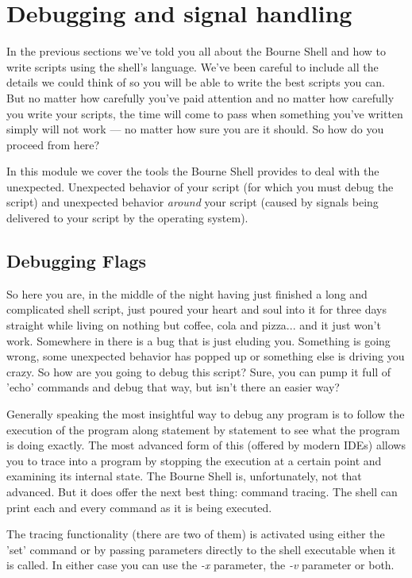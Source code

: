 \section{Debugging and signal handling}
In the previous sections we've told you all about the Bourne Shell and how to
write scripts using the shell's language. We've been careful to include all the
details we could think of so you will be able to write the best scripts you
can. But no matter how carefully you've paid attention and no matter how
carefully you write your scripts, the time will come to pass when something
you've written simply will not work --- no matter how sure you are it should.
So how do you proceed from here?

In this module we cover the tools the Bourne Shell provides to deal with the
unexpected. Unexpected behavior of your script (for which you must debug the
script) and unexpected behavior \emph{around} your script (caused by signals
being delivered to your script by the operating system).

\subsection{Debugging Flags}
So here you are, in the middle of the night having just finished a long and
complicated shell script, just poured your heart and soul into it for three
days straight while living on nothing but coffee, cola and pizza... and it just
won't work. Somewhere in there is a bug that is just eluding you. Something is
going wrong, some unexpected behavior has popped up or something else is
driving you crazy. So how are you going to debug this script? Sure, you can
pump it full of 'echo' commands and debug that way, but isn't there an easier
way?

Generally speaking the most insightful way to debug any program is to follow
the execution of the program along statement by statement to see what the
program is doing exactly. The most advanced form of this (offered by modern
IDEs) allows you to trace into a program by stopping the execution at a certain
point and examining its internal state. The Bourne Shell is, unfortunately, not
that advanced. But it does offer the next best thing: command tracing. The
shell can print each and every command as it is being executed.

The tracing functionality (there are two of them) is activated using either the
'set' command or by passing parameters directly to the shell executable when it
is called. In either case you can use the \emph{-x} parameter, the \emph{-v}
parameter or both.

